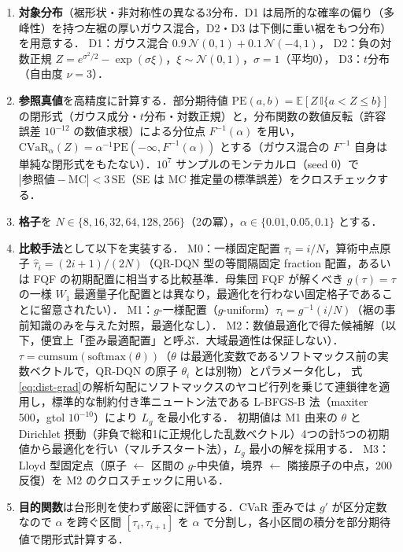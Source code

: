 \documentclass[a4paper,10pt]{jsarticle}
\theoremstyle{definition}
\newcommand{\CVaR}{\mathrm{CVaR}}
\newcommand{\Finv}{F^{-1}}
\newcommand{\E}{\mathbb{E}}
\begin{document}
\begin{enumerate}
  \item \textbf{対象分布}（裾形状・非対称性の異なる3分布．D1 は局所的な確率の偏り（多峰性）を持つ左裾の厚いガウス混合，D2・D3 は下側に重い裾をもつ分布）を用意する．
  D1：ガウス混合 $0.9\,\mathcal N(0,1)+0.1\,\mathcal N(-4,1)$，
  D2：負の対数正規 $Z=e^{\sigma^2/2}-\exp(\sigma\xi)$，$\xi\sim\mathcal N(0,1)$，$\sigma=1$（平均0），
  D3：$t$分布（自由度 $\nu=3$）．
  \item \textbf{参照真値}を高精度に計算する．部分期待値 $\mathrm{PE}(a,b)=\E[Z\,\mathbb{I}\{a<Z\le b\}]$ の閉形式（ガウス成分・$t$分布・対数正規）と，分布関数の数値反転（許容誤差 $10^{-12}$ の数値求根）による分位点 $\Finv(\alpha)$ を用い，
  $\CVaR_\alpha(Z)=\alpha^{-1}\mathrm{PE}(-\infty,\Finv(\alpha))$ とする（ガウス混合の $\Finv$ 自身は単純な閉形式をもたない）．$10^7$ サンプルのモンテカルロ（seed 0）で $|\text{参照値}-\text{MC}|<3\,\mathrm{SE}$（SE は MC 推定量の標準誤差）をクロスチェックする．
  \item \textbf{格子}を $N\in\{8,16,32,64,128,256\}$（2の冪），$\alpha\in\{0.01,0.05,0.1\}$ とする．
  \item \textbf{比較手法}として以下を実装する．
  M0：一様固定配置 $\tau_i=i/N$，算術中点原子 $\hat\tau_i=(2i+1)/(2N)$（QR-DQN 型の等間隔固定 fraction 配置，あるいは FQF の初期配置に相当する比較基準．母集団 FQF が解くべき $g(\tau)=\tau$ の一様 $W_1$ 最適量子化配置とは異なり，最適化を行わない固定格子であることに留意されたい）．
  M1：$g$-一様配置（$g$-uniform）$\tau_i=g^{-1}(i/N)$（裾の事前知識のみを与えた対照，最適化なし）．
  M2：数値最適化で得た候補解（以下，便宜上「歪み最適配置」と呼ぶ．大域最適性は保証しない）．$\tau=\mathrm{cumsum}(\mathrm{softmax}(\theta))$（$\theta$ は最適化変数であるソフトマックス前の実数ベクトルで，QR-DQN の原子 $\theta_i$ とは別物）とパラメータ化し，
  式\eqref{eq:dist-grad}の解析勾配にソフトマックスのヤコビ行列を乗じて連鎖律を適用し，標準的な制約付き準ニュートン法である L-BFGS-B 法（maxiter 500，gtol $10^{-10}$）により $L_g$ を最小化する．
  初期値は M1 由来の $\theta$ と Dirichlet 摂動（非負で総和1に正規化した乱数ベクトル）4つの計5つの初期値から最適化を行い（マルチスタート法），$L_g$ 最小の解を採用する．
  M3：Lloyd 型固定点（原子 $\leftarrow$ 区間の $g$-中央値，境界 $\leftarrow$ 隣接原子の中点，200反復）を M2 のクロスチェックに用いる．
  \item \textbf{目的関数}は台形則を使わず厳密に評価する．CVaR 歪みでは $g'$ が区分定数なので $\alpha$ を跨ぐ区間 $[\tau_i,\tau_{i+1}]$ を $\alpha$ で分割し，各小区間の積分を部分期待値で閉形式計算する．

\end{enumerate}
\end{document}
